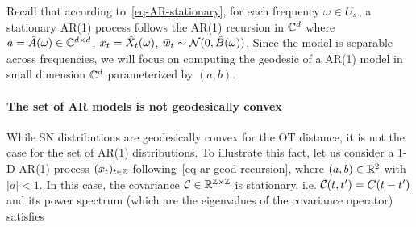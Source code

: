 Recall that according to~\eqref{eq-AR-stationary}, for each frequency $\omega \in U_s$, a stationary AR(1) process follows the AR(1) recursion in $\mathbb{C}^d$
where $a=\hat A(\omega) \in \mathbb{C}^{d \times d}$, $x_t = \hat X_t(\omega)$, $\bar w_t \sim \mathcal{N}(0,\hat B(\omega))$. Since the model is separable across frequencies, we will focus on computing the geodesic of a AR(1) model in small dimension $\mathbb{C}^d$ parameterized by $(a,b)$.


\paragraph{The set of AR models is not geodesically convex}

While SN distributions are geodesically convex for the OT distance, it is not the case for the set of AR(1) distributions. To illustrate this fact, let us consider a 1-D AR(1) process $(x_t)_{t \in \mathbb{Z}}$ following~\eqref{eq-ar-geod-recursion}, where $(a,b) \in \mathbb{R}^2$ with $|a|<1$. In this case, the covariance $\mathcal{C} \in \mathbb{R}^{\mathbb{Z} \times \mathbb{Z}}$ is stationary, i.e. $\mathcal{C}(t,t') = C(t-t')$ and its power spectrum (which are the eigenvalues of the covariance operator) satisfies 

